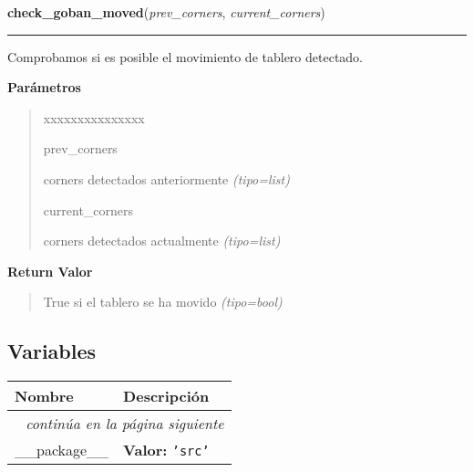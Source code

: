 \hspace{.8\funcindent}\begin{boxedminipage}{\funcwidth}

    \raggedright \textbf{check\_goban\_moved}(\textit{prev\_corners}, \textit{current\_corners})

    \vspace{-1.5ex}

    \rule{\textwidth}{0.5\fboxrule}
\setlength{\parskip}{2ex}
Comprobamos si es posible el movimiento de tablero detectado.

\setlength{\parskip}{1ex}
      \textbf{Parámetros}
      \vspace{-1ex}

      \begin{quote}
        \begin{Ventry}{xxxxxxxxxxxxxxx}

          \item[prev\_corners]


corners detectados anteriormente
            {\it (tipo=list)}

          \item[current\_corners]


corners detectados actualmente
            {\it (tipo=list)}

        \end{Ventry}

      \end{quote}

      \textbf{Return Valor}
    \vspace{-1ex}

      \begin{quote}

True si el tablero se ha movido
      {\it (tipo=bool)}

      \end{quote}

    \end{boxedminipage}



  \subsection{Variables}

    \vspace{-1cm}
\hspace{\varindent}\begin{longtable}{|p{\varnamewidth}|p{\vardescrwidth}|l}
\cline{1-2}
\cline{1-2} \centering \textbf{Nombre} & \centering \textbf{Descripción}& \\
\cline{1-2}
\endhead\cline{1-2}\multicolumn{3}{r}{\small\textit{continúa en la página siguiente}}\\\endfoot\cline{1-2}
\endlastfoot\raggedright \_\-\_\-p\-a\-c\-k\-a\-g\-e\-\_\-\_\- & \raggedright \textbf{Valor:} 
{\tt \texttt{'}\texttt{src}\texttt{'}}&\\
\cline{1-2}
\end{longtable}

